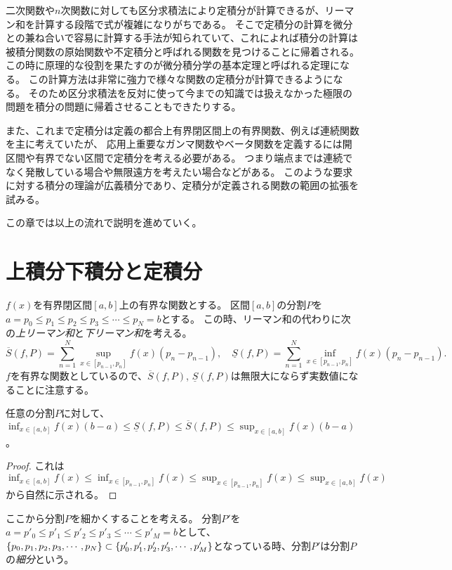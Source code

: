 二次関数や$n$次関数に対しても区分求積法により定積分が計算できるが、リーマン和を計算する段階で式が複雑になりがちである。
そこで定積分の計算を微分との兼ね合いで容易に計算する手法が知られていて、これによれば積分の計算は被積分関数の原始関数や不定積分と呼ばれる関数を見つけることに帰着される。
この時に原理的な役割を果たすのが微分積分学の基本定理と呼ばれる定理になる。
この計算方法は非常に強力で様々な関数の定積分が計算できるようになる。
そのため区分求積法を反対に使って今までの知識では扱えなかった極限の問題を積分の問題に帰着させることもできたりする。

また、これまで定積分は定義の都合上有界閉区間上の有界関数、例えば連続関数を主に考えていたが、
応用上重要なガンマ関数やベータ関数を定義するには開区間や有界でない区間で定積分を考える必要がある。
つまり端点までは連続でなく発散している場合や無限遠方を考えたい場合などがある。
このような要求に対する積分の理論が広義積分であり、定積分が定義される関数の範囲の拡張を試みる。

この章では以上の流れで説明を進めていく。

\section{上積分下積分と定積分}

$f(x)$を有界閉区間$[a, b]$上の有界な関数とする。
区間$[a, b]$の分割$P$を$a = p_0 \le p_1 \le p_2 \le p_3 \le \cdots \le p_N = b$とする。
この時、リーマン和の代わりに次の\emph{上リーマン和}と\emph{下リーマン和}を考える。
$$
\overline{S}(f, P) = \sum_{n = 1}^N \sup_{x \in [p_{n-1}, p_n]}f(x)(p_n-p_{n-1}),
\quad \underline{S}(f, P) = \sum_{n = 1}^N \inf_{x \in [p_{n-1}, p_n]}f(x)(p_n-p_{n-1}).
$$
$f$を有界な関数としているので、$\overline{S}(f, P)$, $\underline{S}(f, P)$は無限大にならず実数値になることに注意する。

\begin{proposition}
任意の分割$P$に対して、$\inf_{x \in [a, b]}f(x)(b-a) \le \underline{S}(f, P) \le \overline{S}(f, P) \le \sup_{x \in [a, b]}f(x)(b-a)$。
\end{proposition}

\begin{proof}
これは$\inf_{x \in [a, b]}f(x) \le \inf_{x \in [p_{n-1}, p_n]}f(x) \le \sup_{x \in [p_{n-1}, p_n]}f(x) \le \sup_{x \in [a, b]}f(x)$から自然に示される。
\end{proof}

ここから分割$P$を細かくすることを考える。
分割$P'$を$a = p'_0 \le p'_1 \le p'_2 \le p'_3 \le \cdots \le p'_M = b$として、$\{ p_0, p_1, p_2, p_3, \cdots, p_N \} \subset \{ p'_0, p'_1, p'_2, p'_3, \cdots, p'_M \}$となっている時、分割$P'$は分割$P$の\emph{細分}という。

